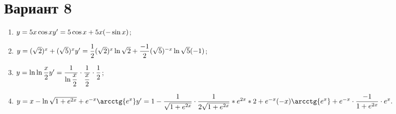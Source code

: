 \documentclass{article}
\begin{document}
\section*{Вариант 8}
\begin{enumerate}
    \item{\begin{math}
        y = 5 x \cos x \\
        y' = 5 \cos x + 5 x (- \sin x)
    \end{math}};
    
    \item{\begin{math}
        y = (\sqrt{2})^x + (\sqrt{5})^{x} \\
        y' = \dfrac 1 2 (\sqrt{2})^x \ln\sqrt{2} + \dfrac {-1} {2} (\sqrt{5})^{-x} \ln\sqrt{5}(-1)
    \end{math}};

    \item{\begin{math}
        y = \ln\ln\dfrac{x}{2} \\
        y' = \dfrac{1}{\ln\dfrac{x}{2}} \cdot \dfrac{1}{\dfrac{x}{2}} \cdot \dfrac{1}{2}
    \end{math}};

    \item{\begin{math}
        y = x - \ln\sqrt{1+e^{2x}}+e^{-x}\arcctg{e^x} \\
        y' = 1 - \dfrac{1}{\sqrt{1+e^{2x}}} \cdot \dfrac{1}{2\sqrt{1+e^{2x}}} * e^{2x} * 2 + e^{-x}(-x)\arcctg{e^x} + e^{-x} \cdot \dfrac{-1}{1+e^{2x}} \cdot e^x.
    \end{math}}
\end{enumerate}
\end{document}
